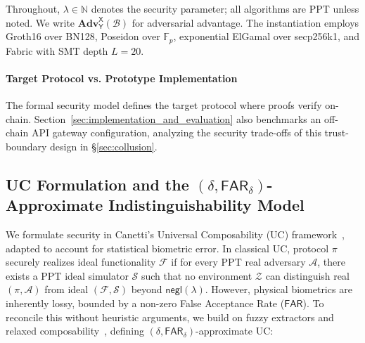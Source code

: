 \documentclass[10pt,letterpaper,journal]{IEEEtran}
\begin{document}
Throughout, $\lambda \in \mathbb{N}$ denotes the security parameter; all algorithms are PPT unless noted. We write $\mathbf{Adv}^{\mathsf{X}}_{\mathsf{Y}}(\mathcal{B})$ for adversarial advantage. The instantiation employs Groth16 over BN128, Poseidon over $\mathbb{F}_p$, exponential ElGamal over secp256k1, and Fabric with SMT depth $L=20$.

\paragraph{Target Protocol vs. Prototype Implementation}
The formal security model defines the target protocol where proofs verify on-chain. Section~\ref{sec:implementation_and_evaluation} also benchmarks an off-chain API gateway configuration, analyzing the security trade-offs of this trust-boundary design in \S\ref{sec:collusion}.

\subsection{UC Formulation and the $(\delta, \mathsf{FAR}_\delta)$-Approximate Indistinguishability Model}
\label{sec:uc-functionalities}

We formulate security in Canetti's Universal Composability (UC) framework~\cite{Canetti2001}, adapted to account for statistical biometric error. In classical UC, protocol $\pi$ securely realizes ideal functionality $\mathcal{F}$ if for every PPT real adversary $\mathcal{A}$, there exists a PPT ideal simulator $\mathcal{S}$ such that no environment $\mathcal{Z}$ can distinguish real $(\pi, \mathcal{A})$ from ideal $(\mathcal{F}, \mathcal{S})$ beyond $\mathsf{negl}(\lambda)$.
However, physical biometrics are inherently lossy, bounded by a non-zero False Acceptance Rate ($\mathsf{FAR}$). To reconcile this without heuristic arguments, we build on fuzzy extractors and relaxed composability~\cite{Dodis2004,JuelsWattenberg1999}, defining $(\delta, \mathsf{FAR}_\delta)$-approximate UC:
\end{document}
